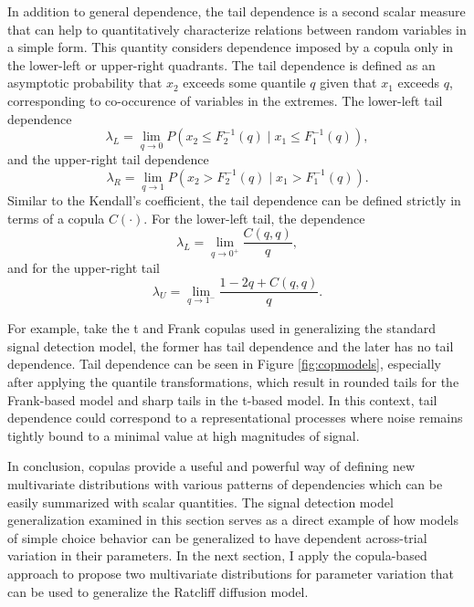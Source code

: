 \documentclass[12pt]{report}
\begin{document}
In addition to general dependence, the tail dependence is a second scalar measure that can help to quantitatively characterize relations between random variables in a simple form. This quantity considers dependence imposed by a copula only in the lower-left or upper-right quadrants. The tail dependence is defined as an asymptotic probability that $x_2$ exceeds some quantile $q$ given that $x_1$ exceeds $q$, corresponding to co-occurence of variables in the extremes. The  lower-left tail dependence
\begin{equation}
\lambda_L = \lim_{q \to 0}P\left(x_2 \leq F_2^{-1}(q) \mid x_1 \leq F_1^{-1}(q)\right), 
\end{equation}
and the upper-right tail dependence
\begin{equation}
\lambda_R = \lim_{q \to 1}P\left(x_2 > F_2^{-1}(q) \mid x_1 > F_1^{-1}(q)\right).
\end{equation}
Similar to the Kendall's coefficient, the tail dependence can be defined  strictly in terms of a copula $C(\cdot)$. For the lower-left tail, the dependence 
\begin{equation}
\lambda_L = \lim_{q \to 0^+}\frac{C(q, q)}{q},
\end{equation}
and for the upper-right tail
\begin{equation}
\lambda_U = \lim_{q \to 1^-}\frac{1 - 2q + C(q, q)}{q}.
\end{equation}

For example, take the t and Frank copulas used in generalizing the standard signal detection model, the former has tail dependence and the later has no tail dependence. Tail dependence can be seen in Figure \ref{fig:copmodels}, especially after applying the quantile transformations, which result in rounded tails for the Frank-based model and sharp tails in the t-based model. In this context, tail dependence could correspond to a representational processes where noise remains tightly bound to a minimal value at high magnitudes of signal.

In conclusion, copulas provide a useful and powerful way of defining new multivariate distributions with various patterns of dependencies which can be easily summarized with scalar quantities. The signal detection model generalization examined in this section serves as a direct example of how models of simple choice behavior can be generalized to have dependent across-trial variation in their parameters. In the next section, I apply the copula-based approach to propose two multivariate distributions for parameter variation that can be used to generalize the Ratcliff diffusion model.
\end{document}
